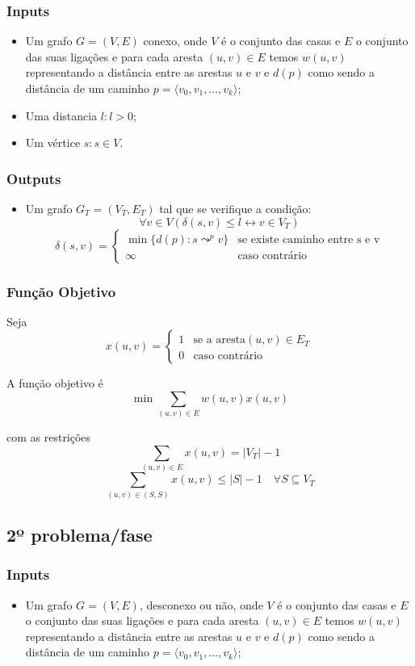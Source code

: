 \documentclass[a4paper,12pt,titlepage]{article}
\let\biconditional\leftrightarrow
\begin{document}
\subsubsection*{Inputs}
\begin{itemize}
\item Um grafo  $G= ( V, E ) $ conexo, onde $V$ é o conjunto das casas e $E$ o conjunto das suas ligações e para cada aresta $(u,v)\in E$ temos $w(u,v)$ representando a distância entre as arestas $u$ e $v$ e $d(p)$ como sendo a distância de um caminho $p = \langle v_0,v_1,\ldots , v_k\rangle$\cite[p.~624]{intro_algo};
\item Uma distancia $l:l > 0$;
\item Um vértice $s:s\in V$.
\end{itemize}

\subsubsection*{Outputs}
\begin{itemize}
\item Um grafo $G_T = ( V_T,E_T )$ tal que se verifique a condição\cite[p.~643]{intro_algo}:
$$ \forall v \in V(\delta(s,v) \leq l \biconditional v \in V_T)$$
$$\delta(s,v) = 
\begin{cases}
\min \{d(p): s \leadsto^p v\} & \text{se existe caminho entre s e v}\\
\infty & \text{caso contrário} 
\end{cases}$$
\end{itemize}

\subsubsection*{Função Objetivo}
Seja $$x(u,v) = \begin{cases}	
1 & \text{se a aresta} (u,v) \in E_T\\
0 & \text{caso contrário} 
\end{cases}$$

A função objetivo é\cite{ieor_mst}
$$\min \sum_{(u,v)\in E} w(u,v)x(u,v)$$

com as restrições 
$$\sum_{(u,v)\in E} x(u,v) = |V_T| - 1$$
$$\sum_{(u,v)\in (S,S)} x(u,v) \leq |S| - 1 \quad \forall S \subseteq  V_T$$

\subsection{2º problema/fase}
\subsubsection*{Inputs}
\begin{itemize}
\item Um grafo  $G= ( V, E ) $, desconexo ou não, onde $V$ é o conjunto das casas e $E$ o conjunto das suas ligações e para cada aresta $(u,v)\in E$ temos $w(u,v)$ representando a distância entre as arestas $u$ e $v$ e $d(p)$ como sendo a distância de um caminho $p = \langle v_0,v_1,\ldots , v_k\rangle$\cite[p.~624]{intro_algo};
\end{itemize}
\end{document}
